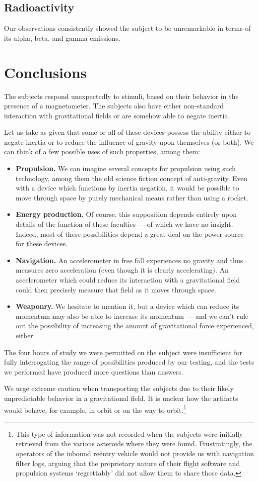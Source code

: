 \documentclass[10pt,twoside,openany]{article}
\theoremstyle{definition}
\begin{document}
\subsection{Radioactivity}
Our observations consistently showed the subject to be unremarkable in terms of its alpha, beta, and gamma emissions.

\section{Conclusions}\label{conclusions}
The subjects respond unexpectedly to stimuli, based on their behavior in the presence of a magnetometer.
The subjects also have either non-standard interaction with gravitational fields or are somehow able to negate inertia.

Let us take as given that some or all of these devices possess the ability either to negate inertia or to reduce the influence of gravity upon themselves (or both).
We can think of a few possible uses of such properties, among them:
\begin{itemize}
\item \textbf{Propulsion.} We can imagine several concepts for propulsion using such technology, among them the old science fiction concept of anti-gravity. Even with a device which functions by inertia negation, it would be possible to move through space by purely mechanical means rather than using a rocket.
\item \textbf{Energy production.} Of course, this supposition depends entirely upon details of the function of these faculties --- of which we have no insight. Indeed, most of these possibilities depend a great deal on the power source for these devices.
\item \textbf{Navigation.} An accelerometer in free fall experiences no gravity and thus measures zero acceleration (even though it is clearly accelerating). An accelerometer which could reduce its interaction with a gravitational field could then precisely measure that field as it moves through space.
\item \textbf{Weaponry.} We hesitate to mention it, but a device which can reduce its momentum may also be able to increase its momentum --- and we can't rule out the possibility of increasing the amount of gravitational force experienced, either.
\end{itemize}
 
The four hours of study we were permitted on the subject were insufficient for fully interrogating the range of possibilities produced by our testing, and the tests we performed have produced more questions than answers.

We urge extreme caution when transporting the subjects due to their likely unpredictable behavior in a gravitational field.
It is unclear how the artifacts would behave, for example, in orbit or on the way to orbit.\footnote{This type of information was not recorded when the subjects were initially retrieved from the various asteroids where they were found. Frustratingly, the operators of the inbound re\"entry vehicle would not provide us with navigation filter logs, arguing that the proprietary nature of their flight software and propulsion systems `regrettably' did not allow them to share those data.}
%
%
\end{document}
